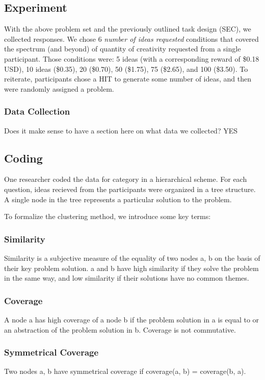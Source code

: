\subsection{Experiment}

With the above problem set and the previously outlined task design (SEC), we collected responses. We chose 6 \emph{number of ideas requested} conditions that covered the spectrum (and beyond) of quantity of creativity requested from a single participant. Those conditions were: 5 ideas (with a corresponding reward of \$0.18 USD), 10 ideas (\$0.35), 20 (\$0.70), 50 (\$1.75), 75 (\$2.65), and 100 (\$3.50). To reiterate, participants chose a HIT to generate some number of ideas, and then were randomly assigned a problem.

\subsubsection{Data Collection}

Does it make sense to have a section here on what data we collected? YES

\subsection{Coding}

One researcher coded the data for category in a hierarchical scheme. For each question, ideas recieved from the participants were organized in a tree structure. A single node in the tree represents a particular solution to the problem.

To formalize the clustering method, we introduce some key terms:

\subsubsection{Similarity}
Similarity is a subjective measure of the equality of two nodes a, b on the basis of their key problem solution. a and b have high similarity if they solve the problem in the same way, and low similarity if their solutions have no common themes.

\subsubsection{Coverage}
A node a has high coverage of a node b if the problem solution in a is equal to or an abstraction of the problem solution in b. Coverage is not commutative.

\subsubsection{Symmetrical Coverage}
Two nodes a, b have symmetrical coverage if coverage(a, b) = coverage(b, a).

